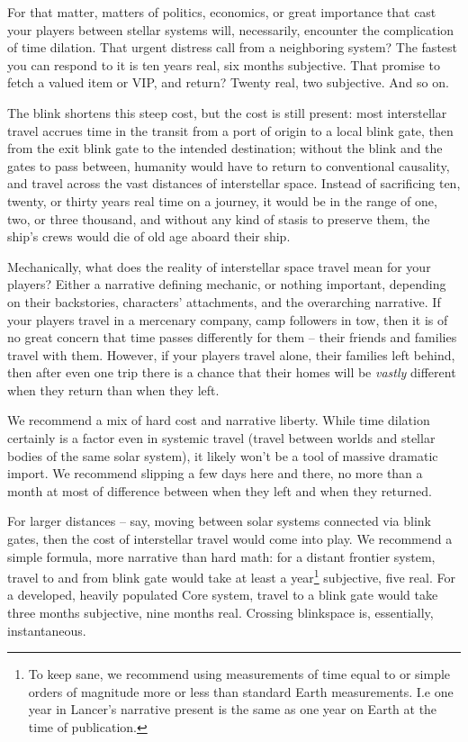 For that matter, matters of politics, economics, or great importance that cast your players between
stellar systems will, necessarily, encounter the complication of time dilation. That urgent distress
call from a neighboring system? The fastest you can respond to it is ten years real, six months
subjective. That promise to fetch a valued item or VIP, and return? Twenty real, two subjective.
And so on.

The blink shortens this steep cost, but the cost is still present: most interstellar travel accrues time
in the transit from a port of origin to a local blink gate, then from the exit blink gate to the intended
destination; without the blink and the gates to pass between, humanity would have to return to
conventional causality, and travel across the vast distances of interstellar space. Instead of
sacrificing ten, twenty, or thirty years real time on a journey, it would be in the range of one, two,
or three thousand, and without any kind of stasis to preserve them, the ship's crews would die of
old age aboard their ship.

Mechanically, what does the reality of interstellar space travel mean for your players? Either a
narrative defining mechanic, or nothing important, depending on their backstories, characters'
attachments, and the overarching narrative. If your players travel in a mercenary company, camp
followers in tow, then it is of no great concern that time passes differently for them -- their friends
and families travel with them. However, if your players travel alone, their families left behind, then
after even one trip there is a chance that their homes will be \textit{vastly} different when they return than
when they left.

We recommend a mix of hard cost and narrative liberty. While time dilation certainly is a factor
even in systemic travel (travel between worlds and stellar bodies of the same solar system), it
likely won't be a tool of massive dramatic import. We recommend slipping a few days here and
there, no more than a month at most of difference between when they left and when they
returned.

For larger distances -- say, moving between solar systems connected via blink gates, then the
cost of interstellar travel would come into play. We recommend a simple formula, more narrative
than hard math: for a distant frontier system, travel to and from blink gate would take at least a
year\footnote{To keep sane, we recommend using measurements of time equal to or simple orders of magnitude more
or less than standard Earth measurements. I.e one year in Lancer's narrative present is the same as one
year on Earth at the time of publication.} subjective, five real. For a developed, heavily populated Core system, travel to a blink gate
would take three months subjective, nine months real. Crossing blinkspace is, essentially,
instantaneous.

